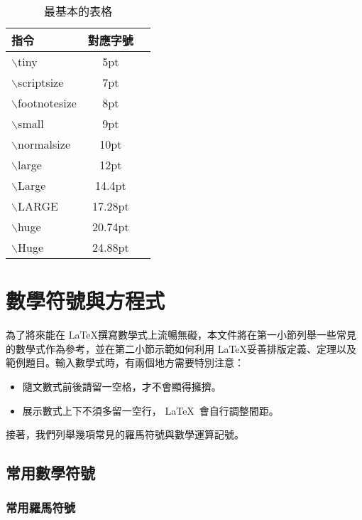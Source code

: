 \begin{table}[h] 
\centering
\caption{最基本的表格}\label{tb:basic_1}
\extrarowheight=6pt   %
\begin{tabular}{lcc}  %
\hline
  指令	                  &  對應字號 \\\hline 
  {\A $\backslash$tiny}   & 5pt	\\
  {\A $\backslash$scriptsize}   & 7pt	\\
  {\A $\backslash$footnotesize}   & 8pt	\\
  {\A $\backslash$small}   & 9pt	\\
  {\A $\backslash$normalsize}   & 10pt	\\
  {\A $\backslash$large}   & 12pt	\\
  {\A $\backslash$Large}   & 14.4pt	\\
  {\A $\backslash$LARGE}   & 17.28pt	\\
  {\A $\backslash$huge}   & 20.74pt	\\
  {\A $\backslash$Huge}   & 24.88pt	\\\hline
\end{tabular}
\end{table}


\section{數學符號與方程式}
為了將來能在 \LaTeX 撰寫數學式上流暢無礙，本文件將在第一小節列舉一些常見的數學式作為參考，並在第二小節示範如何利用 \LaTeX 妥善排版定義、定理以及範例題目。輸入數學式時，有兩個地方需要特別注意：\\

\begin{itemize}
\item 隨文數式前後請留一空格，才不會顯得擁擠。
\item 展示數式上下不須多留一空行， \LaTeX\ 會自行調整間距。
\end{itemize}

接著，我們列舉幾項常見的羅馬符號與數學運算記號。

\subsection{常用數學符號}

\subsubsection{常用羅馬符號}

